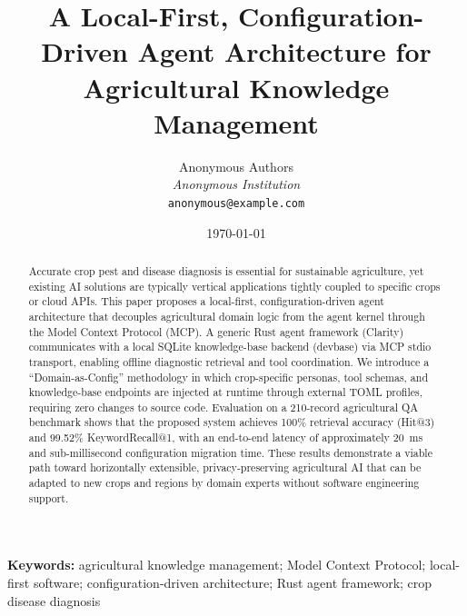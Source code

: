 \documentclass[11pt,a4paper]{article}
\title{A Local-First, Configuration-Driven Agent Architecture for Agricultural Knowledge Management}
\author{Anonymous Authors\\
        \textit{Anonymous Institution}\\
        \texttt{anonymous@example.com}}
\date{\today}
\begin{document}
\maketitle

\begin{abstract}
Accurate crop pest and disease diagnosis is essential for sustainable agriculture, yet existing AI solutions are typically vertical applications tightly coupled to specific crops or cloud APIs. This paper proposes a local-first, configuration-driven agent architecture that decouples agricultural domain logic from the agent kernel through the Model Context Protocol (MCP). A generic Rust agent framework (Clarity) communicates with a local SQLite knowledge-base backend (devbase) via MCP stdio transport, enabling offline diagnostic retrieval and tool coordination. We introduce a ``Domain-as-Config'' methodology in which crop-specific personas, tool schemas, and knowledge-base endpoints are injected at runtime through external TOML profiles, requiring zero changes to source code. Evaluation on a 210-record agricultural QA benchmark shows that the proposed system achieves 100\% retrieval accuracy (Hit@3) and 99.52\% KeywordRecall@1, with an end-to-end latency of approximately 20~ms and sub-millisecond configuration migration time. These results demonstrate a viable path toward horizontally extensible, privacy-preserving agricultural AI that can be adapted to new crops and regions by domain experts without software engineering support.
\end{abstract}

\textbf{Keywords:} agricultural knowledge management; Model Context Protocol; local-first software; configuration-driven architecture; Rust agent framework; crop disease diagnosis










\end{document}

